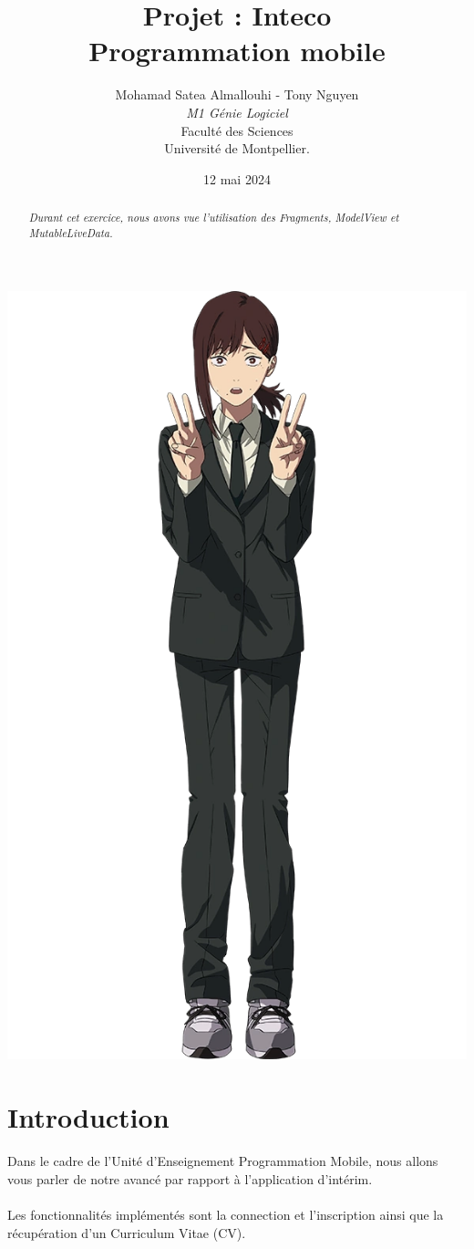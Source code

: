 \documentclass[a4paper]{article}
\title{  Projet : Inteco\\Programmation mobile}
\author{Mohamad Satea Almallouhi - Tony Nguyen\\\emph{M1 Génie Logiciel}\\Faculté des Sciences\\Université de Montpellier.}
\date{12 mai 2024}
\begin{document}
    \maketitle
    \begin{center}
        \includegraphics[height=.95\textwidth]{kobeni}
    \end{center}

    \begin{abstract}     %
      \emph{Durant cet exercice, nous avons vue l'utilisation des Fragments, ModelView et MutableLiveData.}
    \end{abstract}
    \newpage
    \tableofcontents
    \section*{Introduction}
            \paragraph{}
                Dans le cadre de l'Unité d'Enseignement Programmation Mobile, nous allons vous parler de notre avancé par rapport à l'application d'intérim.
            \paragraph{}
                Les fonctionnalités implémentés sont la connection et l'inscription ainsi que la récupération d'un Curriculum Vitae (CV).
\end{document}
